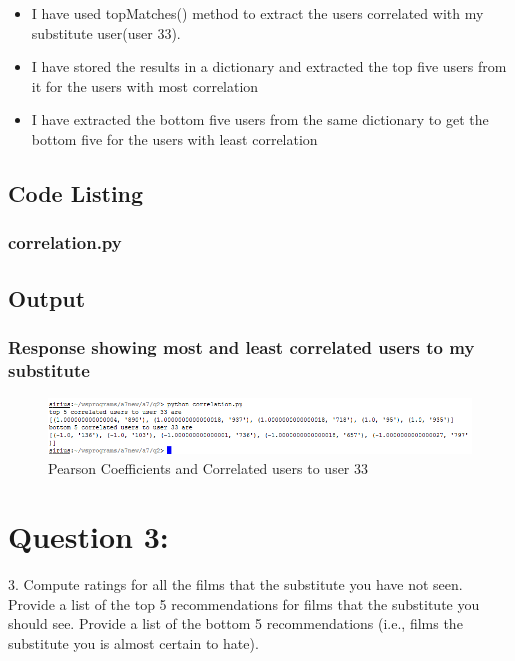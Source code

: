 \documentclass[12pt]{article}
\begin{document}
\begin{itemize}
\item I have used topMatches() method to extract the users correlated with my substitute user(user 33). 
\item I have stored the results in a dictionary and extracted the top five users from it for the users with most correlation
\item I have extracted the bottom five users from the same dictionary to get the bottom five for the users with least correlation


\end{itemize}

\subsection{Code Listing}
\subsubsection{correlation.py}

\newpage
\subsection{Output}
\subsubsection{Response showing most and least correlated users to my substitute }
\begin{figure}[ht]
\includegraphics[scale=0.8]{../../q2/output.png}
\centering
\caption{Pearson Coefficients and Correlated users to user 33}
\label{Correlated users to user 33}
\end{figure}
\newpage


\section{Question 3: }
3.  Compute ratings for all the films that the substitute you
have not seen.  Provide a list of the top 5 recommendations for films
that the substitute you should see.  Provide a list of the bottom
5 recommendations (i.e., films the substitute you is almost certain
to hate). 
\end{document}
